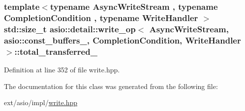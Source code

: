 \subsubsection[{total\+\_\+transferred\+\_\+}]{\setlength{\rightskip}{0pt plus 5cm}template$<$typename Async\+Write\+Stream , typename Completion\+Condition , typename Write\+Handler $>$ std\+::size\+\_\+t {\bf asio\+::detail\+::write\+\_\+op}$<$ Async\+Write\+Stream, {\bf asio\+::const\+\_\+buffers\+\_},                           Completion\+Condition, Write\+Handler $>$\+::total\+\_\+transferred\+\_\+}\label{classasio_1_1detail_1_1write__op_3_01_async_write_stream_00_01asio_1_1const__buffers__1_00_01_014e1524567dd7f87180ace12b51858864_a98fa5c46004ef5815ca9b1453d738288}


Definition at line 352 of file write.\+hpp.



The documentation for this class was generated from the following file\+:\begin{DoxyCompactItemize}
\item 
ext/asio/impl/\hyperlink{impl_2write_8hpp}{write.\+hpp}\end{DoxyCompactItemize}
